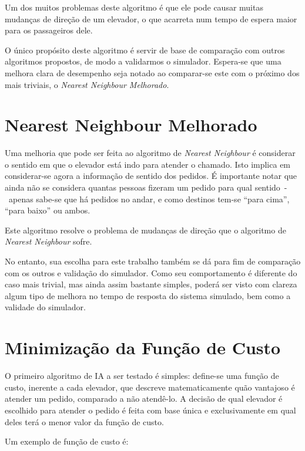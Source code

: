 Um dos muitos problemas deste algoritmo é que ele pode causar muitas mudanças de
direção de um elevador, o que acarreta num tempo de espera maior para os
passageiros dele.

O único propósito deste algoritmo é servir de base de comparação com outros
algoritmos propostos, de modo a validarmos o simulador. Espera-se que uma
melhora clara de desempenho seja notado ao comparar-se este com o próximo dos
mais triviais, o \textit{Nearest Neighbour Melhorado}.


\section{\label{sec:ai:nnm}Nearest Neighbour Melhorado}

Uma melhoria que pode ser feita ao algoritmo de \textit{Nearest Neighbour}
é considerar o sentido em que o elevador está indo para atender o chamado. Isto
implica em considerar-se agora a informação de sentido dos pedidos. É importante
notar que ainda não se considera quantas pessoas fizeram um pedido para qual
sentido~-~apenas sabe-se que há pedidos no andar, e como destinos tem-se ``para
cima'', ``para baixo'' ou ambos.

Este algoritmo resolve o problema de mudanças de direção que o algoritmo de
\textit{Nearest Neighbour} sofre.

No entanto, sua escolha para este trabalho também se dá para fim de comparação
com os outros e validação do simulador. Como seu comportamento é diferente do
caso mais trivial, mas ainda assim bastante simples, poderá ser visto com clareza
algum tipo de melhora no tempo de resposta do sistema simulado, bem como a validade do simulador.

\section{\label{sec:ai:minimize-cost-function}Minimização da Função de Custo}

O primeiro algoritmo de IA a ser testado é simples: define-se uma
função de custo, inerente a cada elevador, que descreve matematicamente quão
vantajoso é atender um pedido, comparado a não atendê-lo. A decisão de qual
elevador é escolhido para atender o pedido é feita com base única e
 exclusivamente em qual deles terá o menor valor da função de custo.

Um exemplo de função de custo é:

